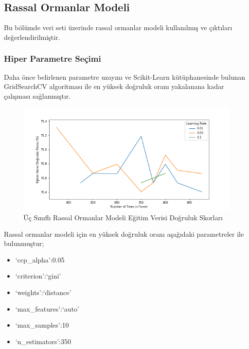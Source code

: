 \documentclass[12pt,twoside]{deuthesis}
\providecommand{\tightlist}{%
  \setlength{\itemsep}{0pt}\setlength{\parskip}{0pt}}
\begin{document}
\hypertarget{mult_rf}{%
\subsection{Rassal Ormanlar Modeli}\label{mult_rf}}

Bu bölümde veri seti üzerinde rassal ormanlar modeli kullanılmış ve çıktıları değerlendirilmiştir.

\hypertarget{hiper-parametre-seuxe7imi-1}{%
\subsubsection{Hiper Parametre Seçimi}\label{hiper-parametre-seuxe7imi-1}}

Daha önce belirlenen parametre uzayını ve Scikit-Learn kütüphanesinde bulunan GridSearchCV algoritması ile en yüksek doğruluk oranı yakalanana kadar çalışması sağlanmıştır.
\begin{figure}

{\centering \includegraphics[width=1.1\linewidth,height=0.5\textheight]{figure/RF_Grid_Graph} 

}

\caption{Üç Sınıflı Rassal Ormanlar Modeli Eğitim Verisi Doğruluk Skorları}\label{fig:unnamed-chunk-27}
\end{figure}
Rassal ormanlar modeli için en yüksek doğruluk oranı aşağıdaki parametreler ile bulunmuştur;
\begin{itemize}
\tightlist
\item
  `ccp\_alpha':0.05
\item
  `criterion':`gini'
\item
  `weights':`distance'
\item
  `max\_features':`auto'
\item
  `max\_samples':10
\item
  `n\_estimators':350
\end{itemize}
\newpage
\end{document}
